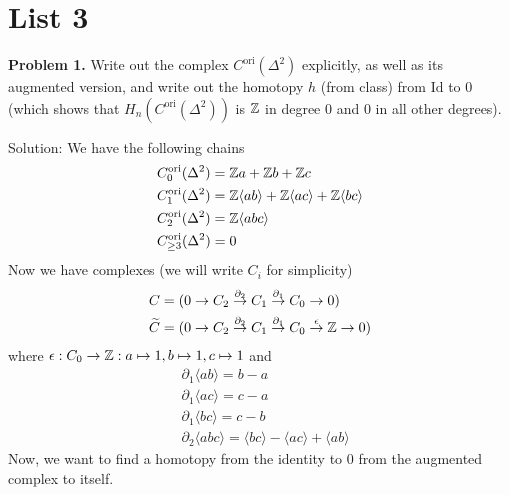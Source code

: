 \section{List 3}
\begin{dang}
\textbf{Problem 1.} Write out the complex \(C^{\mathrm{ori}}(\Delta^2)\) explicitly, 
as well as its augmented version, and write out the homotopy \(h\) (from class) 
from \(\mathrm{Id}\) to \(0\) (which shows that \(H_n(C^{\mathrm{ori}}(\Delta^2))\) 
is \(\mathbb{Z}\) in degree \(0\) and \(0\) in all other degrees).
\end{dang}
Solution: We have the following chains 
\begin{equation}
    \begin{split}
        & C^{\text{ori}}_0(\Delta^2) = \mathbb{Z} a + \mathbb{Z} b +\mathbb{Z} c \\
        & C^{\text{ori}}_1(\Delta^2) = \mathbb{Z}\langle ab\rangle+\mathbb{Z}\langle ac\rangle+\mathbb{Z}\langle bc\rangle\\
        &C^{\text{ori}}_2(\Delta^2)=\mathbb{Z}\langle abc\rangle\\
        &C^{\text{ori}}_{\geq3}(\Delta^2)=0
    \end{split}
\end{equation}
Now we have complexes (we will write $C_i$ for simplicity)
\begin{equation}
    \begin{split}
        &C = (0\to C_2\overset{\partial_2}{\to}C_1\overset{\partial_1}{\to}C_0\to 0)\\
        &\widetilde{C}=(0\to C_2\overset{\partial_2}{\to}C_1\overset{\partial_1}{\to}C_0\overset{\epsilon}{\to} \mathbb{Z}\to0)
    \end{split}
\end{equation}
where $\epsilon:C_0\to \mathbb{Z}:a\mapsto 1, b\mapsto 1,c\mapsto 1$ and 
\begin{equation}\label{equation: partial_1, partial_2 operations}
    \begin{split}
        &\partial_1\langle ab\rangle = b - a\\
        &\partial_1\langle ac\rangle = c - a\\
        &\partial_1\langle bc\rangle = c - b\\
        &\partial_2\langle abc\rangle = \langle bc\rangle - \langle ac\rangle + \langle ab\rangle
    \end{split}
\end{equation}
Now, we want to find a homotopy from the identity to 0 from the augmented complex to itself.
\begin{center}
\end{center}

